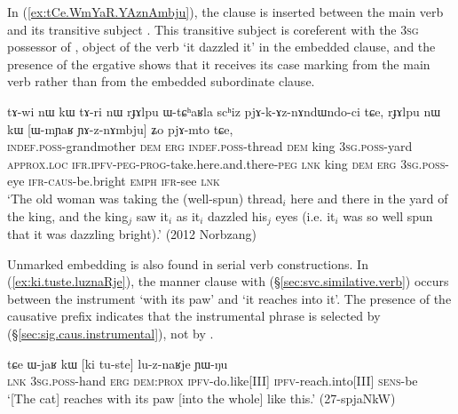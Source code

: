 In (\ref{ex:tCe.WmYaR.YAznAmbju}), the clause  is inserted between the main verb  and its transitive subject . This transitive subject is coreferent with the \textsc{3sg} possessor of , object of the verb  `it dazzled it' in the embedded clause, and the presence of the ergative  shows that it receives its case marking from the main verb rather than from the embedded subordinate clause.  
 
\begin{exe}
\ex \label{ex:tCe.WmYaR.YAznAmbju}
\gll tɤ-wi nɯ kɯ tɤ-ri nɯ rɟɤlpu ɯ-tɕʰaʁla scʰiz pjɤ-k-ɤz-nɤndɯndo-ci tɕe, rɟɤlpu nɯ kɯ [ɯ-mɲaʁ ɲɤ-z-nɤmbju] ʑo pjɤ-mto tɕe,  \\
\textsc{indef}.\textsc{poss}-grandmother \textsc{dem} \textsc{erg} \textsc{indef}.\textsc{poss}-thread \textsc{dem} king \textsc{3sg}.\textsc{poss}-yard \textsc{approx}.\textsc{loc} \textsc{ifr}.\textsc{ipfv}-\textsc{peg}-\textsc{prog}-take.here.and.there-\textsc{peg} \textsc{lnk} king  \textsc{dem} \textsc{erg} \textsc{3sg}.\textsc{poss}-eye \textsc{ifr}-\textsc{caus}-be.bright \textsc{emph} \textsc{ifr}-see \textsc{lnk} \\
\glt `The old woman was taking the (well-spun) thread$_i$ here and there in the yard of the king, and the king$_j$ saw it$_i$ as it$_i$ dazzled his$_j$ eyes (i.e. it$_i$ was so well spun that it was dazzling bright).'  (2012 Norbzang)
\end{exe} 


Unmarked embedding is also found in serial verb constructions. In (\ref{ex:ki.tuste.luznaRje}), the manner clause with  (§\ref{sec:svc.similative.verb}) occurs between the instrument  `with its paw' and  `it reaches into it'. The presence of the causative prefix  indicates that the instrumental phrase is selected by  (§\ref{sec:sig.caus.instrumental}), not by .

\begin{exe}
\ex \label{ex:ki.tuste.luznaRje}
 \gll tɕe ɯ-jaʁ kɯ [ki tu-ste] lu-z-naʁje ɲɯ-ŋu  \\
 \textsc{lnk} \textsc{3sg}.\textsc{poss}-hand \textsc{erg} \textsc{dem}:\textsc{prox} \textsc{ipfv}-do.like[III]  \textsc{ipfv}-reach.into[III] \textsc{sens}-be   \\
\glt `[The cat] reaches with its paw [into the whole] like this.' (27-spjaNkW)
\end{exe}

